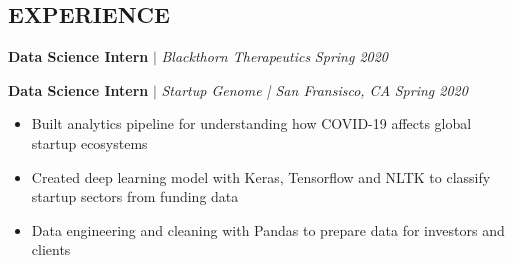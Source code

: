 \documentclass[margin]{res}
\begin{document}
\begin{resume}
\section{EXPERIENCE} 
    \textbf{Data Science Intern} $\mid$ \textit{Blackthorn Therapeutics} \hfill {\sl Spring 2020}
    \begin{itemize}
    \end{itemize} \vspace*{-10pt}

    \textbf{Data Science Intern} $\mid$ \textit{Startup Genome | San Fransisco, CA} \hfill {\sl Spring 2020}
    \begin{itemize}
        \item Built analytics pipeline for understanding how COVID-19 affects global startup ecosystems
        \item Created deep learning model with Keras, Tensorflow and NLTK to classify startup sectors from funding data 
        \item Data engineering and cleaning with Pandas to prepare data for investors and clients
    \end{itemize} \vspace*{-10pt}


\end{resume}
\end{document}
